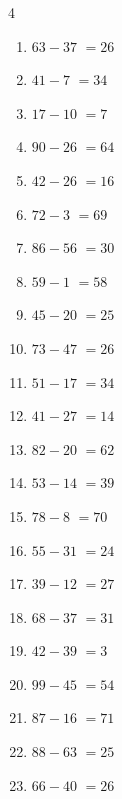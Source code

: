 \begin{multicols}{4}
\begin{enumerate}
  \item $63-37$
        $=26$

  \item $41-7$
        $=34$

  \item $17-10$
        $=7$

  \item $90-26$
        $=64$

  \item $42-26$
        $=16$

  \item $72-3$
        $=69$

  \item $86-56$
        $=30$

  \item $59-1$
        $=58$

  \item $45-20$
        $=25$

  \item $73-47$
        $=26$

  \item $51-17$
        $=34$

  \item $41-27$
        $=14$

  \item $82-20$
        $=62$

  \item $53-14$
        $=39$

  \item $78-8$
        $=70$

  \item $55-31$
        $=24$

\columnbreak %

  \item $39-12$
        $=27$

  \item $68-37$
        $=31$

  \item $42-39$
        $=3$

  \item $99-45$
        $=54$

  \item $87-16$
        $=71$

  \item $88-63$
        $=25$

  \item $66-40$
        $=26$


\end{enumerate}
\end{multicols}
